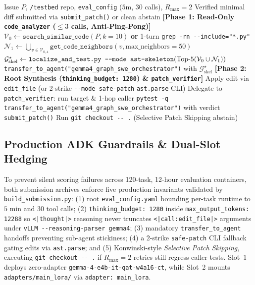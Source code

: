 \documentclass[10pt,twocolumn,letterpaper]{article}
\begin{document}
\begin{algorithm}[t]
\caption{Dual-Slot ADK Steiner Localization \& Verified Repair}
\label{alg:funnel}
\scriptsize
\begin{algorithmic}[1]
\Require Issue $P$, \texttt{/testbed} repo, \texttt{eval\_config} ($5\text{m}$, $30$ calls), $R_{\max}=2$
\Ensure Verified minimal diff submitted via \texttt{submit\_patch()} or clean abstain
\State \textbf{[Phase 1: Read-Only \texttt{code\_analyzer} ($\le 3$ calls, Anti-Ping-Pong)]}
\State $\mathcal{V}_0 \gets \texttt{search\_similar\_code}(P, k{=}10)$ \textbf{or} 1-turn \texttt{grep -rn -\/-include="*.py"}
\State $\mathcal{N}_1 \gets \bigcup_{v \in \mathcal{V}_{0,4}} \texttt{get\_code\_neighbors}(v, \text{max\_neighbors}{=}50)$
\State $\mathcal{G}^\star_{\text{skel}} \gets \texttt{localize\_and\_test.py -\/-mode ast-skeleton}(\text{Top-}5(\mathcal{V}_0 \cup \mathcal{N}_1))$
\State \texttt{transfer\_to\_agent("gemma4\_graph\_swe\_orchestrator")} with $\mathcal{G}^\star_{\text{skel}}$
\State \textbf{[Phase 2: Root Synthesis (\texttt{thinking\_budget: 1280}) \& \texttt{patch\_verifier}]}
    \State Apply edit via \texttt{edit\_file} (or 2-strike \texttt{-\/-mode safe-patch} \texttt{ast.parse} CLI)
    \State Delegate to \texttt{patch\_verifier}: run target \& 1-hop caller \texttt{pytest -q}
    \State \texttt{transfer\_to\_agent("gemma4\_graph\_swe\_orchestrator")} with verdict
     \Return \texttt{submit\_patch()}
     \State Run \texttt{git checkout -\/- .} (Selective Patch Skipping abstain)
    \EndIf
\EndFor
\end{algorithmic}
\end{algorithm}

\subsection{Production ADK Guardrails \& Dual-Slot Hedging}
\label{sec:verifier}
To prevent silent scoring failures across 120-task, 12-hour evaluation containers, both submission archives enforce five production invariants validated by \texttt{build\_submission.py}: (1) root \texttt{eval\_config.yaml} bounding per-task runtime to $5\text{ min}$ and $30$ tool calls; (2) \texttt{thinking\_budget: 1280} inside \texttt{max\_output\_tokens: 12288} so \texttt{<|thought|>} reasoning never truncates \texttt{<|call:edit\_file|>} arguments under \texttt{vLLM -\/-reasoning-parser gemma4}; (3) mandatory \texttt{transfer\_to\_agent} handoffs preventing sub-agent stickiness; (4) a 2-strike \texttt{safe-patch} CLI fallback gating edits via \texttt{ast.parse}; and (5) Konwinski-style \emph{Selective Patch Skipping}, executing \texttt{git checkout -\/- .} if $R_{\max}{=}2$ retries still regress caller tests. Slot~1 deploys zero-adapter \texttt{gemma-4-e4b-it-qat-w4a16-ct}, while Slot~2 mounts \texttt{adapters/main\_lora/} via \texttt{adapter: main\_lora}.
\end{document}
